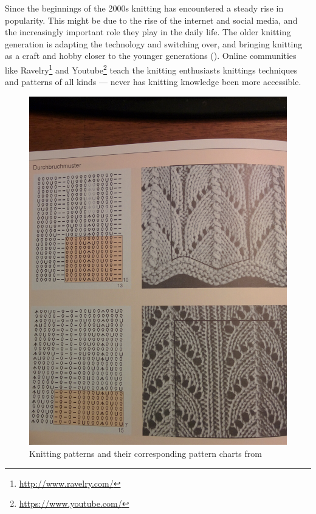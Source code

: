 Since the beginnings of the 2000s knitting has encountered a steady rise in popularity. This might be due to the rise of the internet and social media, and the increasingly important role they play in the daily life. The older knitting generation is adapting the technology and switching over, and bringing knitting as a craft and hobby closer to the younger generations (\cite{lewis_rise_of_knitting}). Online communities like Ravelry\footnote{\url{http://www.ravelry.com/}} and Youtube\footnote{\url{https://www.youtube.com/}} teach the knitting enthusiasts knittings techniques and patterns of all kinds --- never has knitting knowledge been more accessible.

\begin{figure}
    \includegraphics[width=1\linewidth]{images/knitting_pattern_chart_book.jpg}
   \caption[{Knitting patterns and their corresponding pattern charts \protect{}}]{Knitting patterns and their corresponding pattern charts from \protect\cite[p142]{Natter1983}}
\end{figure}


